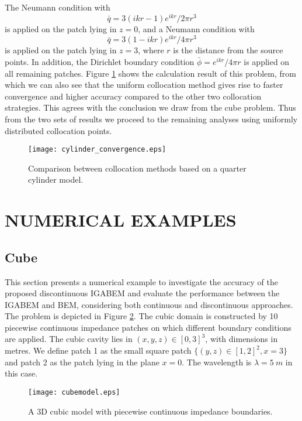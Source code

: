 \documentclass[review]{elsarticle}
\begin{document}
The Neumann condition with
\begin{equation}
	\bar{q}=3(ikr-1)e^{ikr}/2 \pi r^3
\end{equation}  
is applied on the patch lying in $z=0$, 
and a Neumann condition with
\begin{equation}
	\bar{q}=3(1-ikr)e^{ikr}/4 \pi r^3
\end{equation}  
is applied on the patch lying in $z=3$, where $r$ is the distance from the source points. In addition, the Dirichlet boundary condition $\bar{\phi}= e^{ikr}/4 \pi r$ is applied on all remaining patches. Figure \ref{cylinder_convergence} shows the calculation result of this problem, from which we can also see that the uniform collocation method gives rise to faster convergence and higher accuracy compared to the other two collocation strategies. This agrees with the conclusion we draw from the cube problem. Thus from the two sets of results we proceed to the remaining analyses using uniformly distributed collocation points.


\begin{figure}[!htb]
	\centering
	\texttt{[image: cylinder\_convergence.eps]} 
	\caption{Comparison between collocation methods based on a quarter cylinder model.}\label{cylinder_convergence}         
\end{figure}


\section{NUMERICAL EXAMPLES}

\subsection{Cube} 
This section presents a numerical example to investigate the accuracy of the proposed discontinuous IGABEM and evaluate the performance between the IGABEM and BEM, considering both continuous and discontinuous approaches. The problem is depicted in Figure \ref{model}. The cubic domain is constructed by 10 piecewise continuous impedance patches on which different boundary conditions are applied. The cubic cavity lies in $(x,y,z)\in[0,3]^3$, with dimensions in metres. We define patch 1 as the small square patch $\{(y,z)\in[1,2]^2,x=3\}$ and patch 2 as the patch lying in the plane $x=0$. The wavelength is $\lambda = 5\ m$ in this case. 
\begin{figure}[!htb]
	\centering
	\texttt{[image: cubemodel.eps]} 
	\caption{A 3D cubic model with piecewise continuous impedance boundaries.}\label{model}                                                                                                                                                                                                                                
\end{figure}
\end{document}
